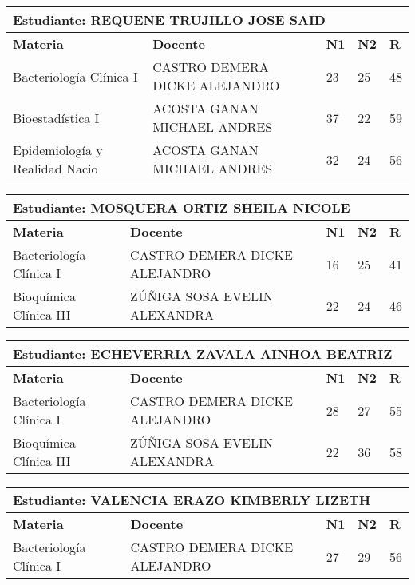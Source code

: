 \small
\begin{tabularx}{\textwidth}{|p{5cm}|p{7cm}|X|X|X|}
\hline
\multicolumn{5}{|p{\dimexpr\textwidth-2\tabcolsep-2\arrayrulewidth}|}{\textbf{Estudiante: REQUENE TRUJILLO JOSE SAID }}\\\hline
\textbf{Materia} & \textbf{Docente} & \textbf{N1} & \textbf{N2} & \textbf{R} \\ \hline
Bacteriología Clínica I & CASTRO DEMERA DICKE ALEJANDRO  & 23 & 25& 48 \\ \hline
Bioestadística I & ACOSTA GANAN MICHAEL ANDRES  & 37 & 22& 59 \\ \hline
Epidemiología y Realidad Nacio & ACOSTA GANAN MICHAEL ANDRES  & 32 & 24& 56 \\ \hline
\end{tabularx}\vspace{10mm}
\small
\begin{tabularx}{\textwidth}{|p{5cm}|p{7cm}|X|X|X|}
\hline
\multicolumn{5}{|p{\dimexpr\textwidth-2\tabcolsep-2\arrayrulewidth}|}{\textbf{Estudiante: MOSQUERA ORTIZ SHEILA NICOLE }}\\\hline
\textbf{Materia} & \textbf{Docente} & \textbf{N1} & \textbf{N2} & \textbf{R} \\ \hline
Bacteriología Clínica I & CASTRO DEMERA DICKE ALEJANDRO  & 16 & 25& 41 \\ \hline
Bioquímica Clínica III & ZÚÑIGA SOSA EVELIN ALEXANDRA  & 22 & 24& 46 \\ \hline
\end{tabularx}\vspace{10mm}
\small
\begin{tabularx}{\textwidth}{|p{5cm}|p{7cm}|X|X|X|}
\hline
\multicolumn{5}{|p{\dimexpr\textwidth-2\tabcolsep-2\arrayrulewidth}|}{\textbf{Estudiante: ECHEVERRIA ZAVALA AINHOA BEATRIZ }}\\\hline
\textbf{Materia} & \textbf{Docente} & \textbf{N1} & \textbf{N2} & \textbf{R} \\ \hline
Bacteriología Clínica I & CASTRO DEMERA DICKE ALEJANDRO  & 28 & 27& 55 \\ \hline
Bioquímica Clínica III & ZÚÑIGA SOSA EVELIN ALEXANDRA  & 22 & 36& 58 \\ \hline
\end{tabularx}\vspace{10mm}
\small
\begin{tabularx}{\textwidth}{|p{5cm}|p{7cm}|X|X|X|}
\hline
\multicolumn{5}{|p{\dimexpr\textwidth-2\tabcolsep-2\arrayrulewidth}|}{\textbf{Estudiante: VALENCIA ERAZO KIMBERLY LIZETH }}\\\hline
\textbf{Materia} & \textbf{Docente} & \textbf{N1} & \textbf{N2} & \textbf{R} \\ \hline
Bacteriología Clínica I & CASTRO DEMERA DICKE ALEJANDRO  & 27 & 29& 56 \\ \hline
\end{tabularx}\vspace{10mm}
